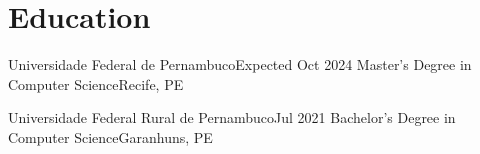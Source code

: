 \section{Education}
    \resumeSubHeadingListStart

    \resumeSubheading
    {Universidade Federal de Pernambuco}{Expected Oct 2024}
    {Master's Degree in Computer Science}{Recife, PE}

    \resumeSubheading
    {Universidade Federal Rural de Pernambuco}{Jul 2021}
    {Bachelor's Degree in Computer Science}{Garanhuns, PE}
    \resumeItemListStart
    \resumeItemListEnd

    \resumeSubHeadingListEnd